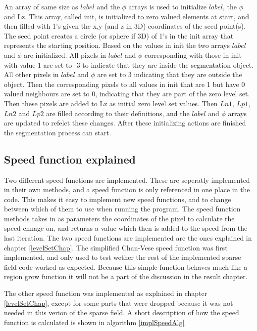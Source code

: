 An array of same size as $label$ and the $\phi$ arrays is used to initialize $label$, the $\phi$ and Lz. This array, called init, is initialized to zero valued elements at start, and then filled with 1's given the x,y (and z in 3D) coordinates of the seed point(s). The seed point creates a circle (or sphere if 3D) of 1's in the init array that represents the starting position. Based on the values in init the two arrays $label$ and $\phi$ are initialized. All pixels in $label$ and $\phi$ corresponding with those in init with value 1 are set to -3 to indicate that they are inside the segmentation object. All other pixels in $label$ and $\phi$ are set to 3 indicating that they are outside the object. Then the corresponding pixels to all values in init that are 1 but have 0 valued neighbours are set to 0, indicating that they are part of the zero level set. Then these pixels are added to Lz as initial zero level set values. Then $Ln1$, $Lp1$, $Ln2$ and $Lp2$ are filled according to their definitions, and the $label$ and $\phi$ arrays are updated to refelct these changes. After these initializing actions are finished the segmentation process can start.

\subsection{Speed function explained}
Two different speed functions are implemented. These are seperatly implemented in their own methods, and a speed function is only referenced in one place in the code. This makes it easy to implement new speed functions, and to change between which of them to use when running the program. The speed function methods takes in as parameters the coordinates of the pixel to calculate the speed chnage on, and returns a value which then is added to the speed from the last iteration. The two speed functions are implemented are the ones explained in chapter \ref{levelSetChap}. The simplified Chan-Vese speed function was first implemented, and only used to test wether the rest of the implemented sparse field code worked as expected. Because this simple function behaves much like a region grow function it will not be a part of the discussion in the result chapter. 

The other speed function was implemented as explained in chapter \ref{levelSetChap}, except for some parts that were dropped because it was not needed in this verion of the sparse field. A short description of how the speed function is calculated is shown in algorithm \ref{implSpeedAlg}

